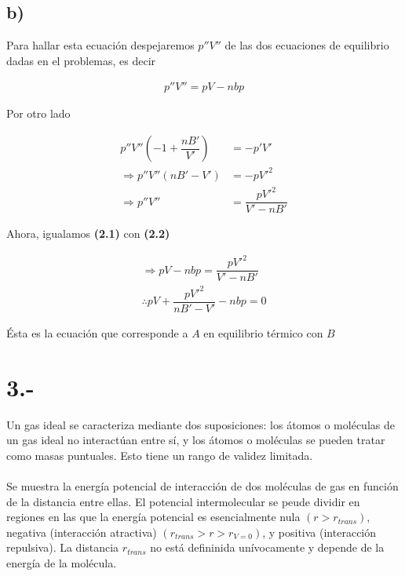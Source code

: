 \documentclass{article}
\begin{document}
\begin{tcolorbox}[breakable]
    
    
    \subsection*{b)}
    Para hallar esta ecuación despejaremos $p''V''$ de las dos ecuaciones de equilibrio dadas en el problemas, es decir 
    
    \begin{align*}
        p''V''=pV-nbp \tag{2.1}
    \end{align*}
    
    Por otro lado 
    
    \begin{align*}
        p''V''\left(-1+\dfrac{nB'}{V'}\right)&=-p'V'\\
        \Rightarrow p''V''\left(nB'-V'\right)&=-pV'^2\\
        \Rightarrow p''V''&=\dfrac{pV'^2}{V'-nB'} \tag{2.2}
    \end{align*}
    
    Ahora, igualamos \textbf{(2.1)} con \textbf{(2.2)}
    
    \begin{align*}
        \Rightarrow pV-nbp=\dfrac{pV'^2}{V'-nB'}\\
        \therefore pV+\dfrac{pV'^2}{nB'-V'}-nbp=0
    \end{align*}
    
    Ésta es la ecuación que corresponde a $A$ en equilibrio térmico con $B$
    
    
\end{tcolorbox}
\section*{3.-}
Un gas ideal se caracteriza mediante dos suposiciones: los átomos o moléculas de un gas 
ideal no interactúan entre sí, y los átomos o moléculas se pueden tratar como masas 
puntuales. Esto tiene un rango de validez limitada. \\ \\ 
Se muestra la energía potencial de interacción de dos moléculas de gas en función 
de la distancia entre ellas. El potencial intermolecular se peude dividir en regiones
en las que la energía potencial es esencialmente nula $(r>r_{trans})$, negativa
(interacción atractiva) $(r_{trans} > r > r_{V=0})$, y positiva (interacción repulsiva).
La distancia $r_{trans}$ no está defininida unívocamente y depende de la energía de la 
molécula.
\end{document}
